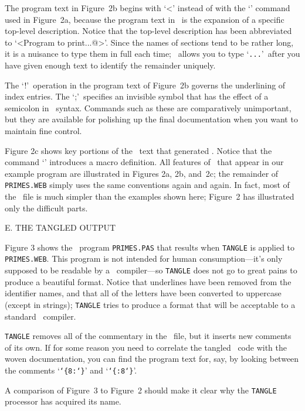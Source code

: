 The program text in Figure~2b begins with `{\tt@<}' instead of with the
`{\tt@p}' command used in Figure~2a, because the program text in~
is the expansion of a specific top-level description. Notice that the
top-level description has been abbreviated to `{\tt@<Program to print...@>}'.
Since the names of sections tend to be rather long, it is a nuisance to
type them in full each time; \WEB\ allows you to type `{\tt...}'\ after you
have given enough text to identify the remainder uniquely.

The `{\tt@!}'\ operation in the program text of Figure~2b governs the
underlining of index entries. The `{\tt@;}'\ specifies an invisible symbol
that has the effect of a semicolon in \PASCAL\ syntax. Commands such as these
are comparatively unimportant, but they are available for polishing up
the final documentation when you want to maintain fine control.

Figure 2c shows key portions of the \WEB\ text that generated .
Notice that the command `{\tt@d}' introduces a macro definition.
All features of \WEB\ that appear in our example program are illustrated
in Figures 2a, 2b, and~2c; the remainder of {\tt PRIMES.WEB} simply
uses the same conventions again and again. In fact, most of the \WEB\
file is much simpler than the examples shown here; Figure~2 has
illustrated only the difficult parts.

\beginsection E. THE TANGLED OUTPUT

Figure 3 shows the \PASCAL\ program {\tt PRIMES.PAS} that results when
{\tt TANGLE} is applied to {\tt PRIMES.WEB}. This program is not intended
for human consumption---it's only supposed to be readable by a \PASCAL\
compiler---so {\tt TANGLE} does not go to great pains to produce a
beautiful format. Notice that underlines have been removed from the
identifier names, and that all of the letters have been converted to
uppercase (except in strings); {\tt TANGLE} tries to produce a format
that will be acceptable to a standard \PASCAL\ compiler.

{\tt TANGLE} removes all of the commentary in the \WEB\ file, but it
inserts new comments of its own. If for some reason you need
to correlate the tangled \PASCAL\ code with the woven documentation,
you can find the program text for, say, \sec8 by looking between
the comments `{\tt\char`\{8:\char`\}}' and `{\tt\char`\{:8\char`\}}'.

A comparison of Figure~3 to Figure~2 should make it clear why the
{\tt TANGLE} processor has acquired its name.

